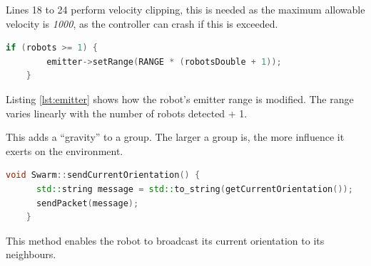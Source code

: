Lines 18 to 24 perform velocity clipping, this is needed as the maximum allowable velocity is \textit{1000}, as the controller can crash if this is exceeded.

\begin{lstlisting}[language=C++, caption={Emitter range manipulation},label={lst:emitter}]
	if (robots >= 1) {
		emitter->setRange(RANGE * (robotsDouble + 1));
	}
\end{lstlisting}

Listing \ref{lst:emitter} shows how the robot's emitter range is modified. The range varies linearly with the number of robots detected + 1.

This adds a ``gravity''
to a group. The larger a group is, the more influence it exerts on the environment.
\clearpage

\begin{lstlisting}[language=C++, caption={Broadcast current orientation},label={lst:broadcast}]
	void Swarm::sendCurrentOrientation() {
	  std::string message = std::to_string(getCurrentOrientation());
	  sendPacket(message);
	}
\end{lstlisting}

This method enables the robot to broadcast its current orientation to its neighbours.

